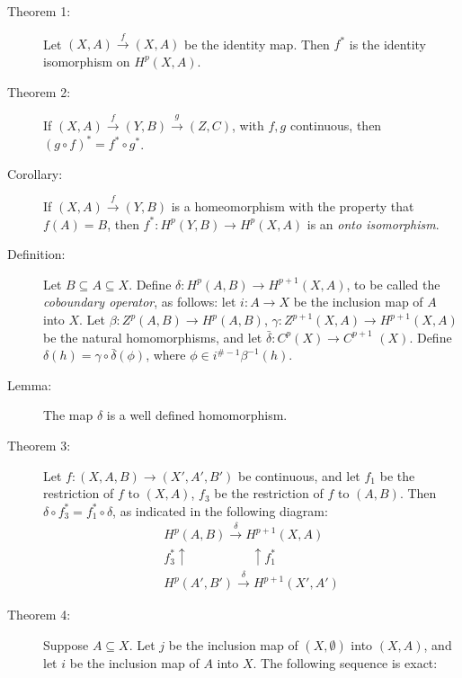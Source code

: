 \documentclass{article}
\begin{document}
\begin{description}

\item[Theorem 1:] Let $(X,A) \xrightarrow{\ f \ } (X,A)$ be the identity map. Then $f^*$ is the identity isomorphism on $H^p(X,A)$.

\item[Theorem 2:] If $(X,A) \xrightarrow{\ f \ } (Y,B) \xrightarrow{\ g \ } (Z,C)$, with $f,g$ continuous, then $(g \circ f)^* = f^* \circ g^*$.

\item[Corollary:] If $(X,A) \xrightarrow{\ f \ } (Y,B)$ is a homeomorphism with the property that $f(A)=B$, then $f^*: H^p(Y,B) \longrightarrow H^p(X,A)$ is an \emph{onto isomorphism}.

\item[Definition:] Let $B \subseteq A \subseteq X$. Define $\delta: H^p(A,B) \longrightarrow H^{p+1}(X,A)$, to be called the \emph{coboundary operator}, as follows: let $i: A \rightarrow X$ be the inclusion map of $A$ into $X$. Let $\beta: Z^p(A,B) \longrightarrow H^p(A,B)$, $\gamma: Z^{p+1}(X,A) \longrightarrow H^{p+1}(X,A)$ be the natural homomorphisms, and let $\bar{\delta}: C^p(X) \longrightarrow C^{p+1}$ $(X)$. Define $\delta(h) = \gamma \circ \bar{\delta} (\phi)$, where $\phi \in i^{\# -1} \beta^{-1}(h)$.

\item[Lemma:] The map $\delta$ is a well defined homomorphism.

\item[Theorem 3:] Let $f: (X,A,B) \longrightarrow (X',A',B')$ be continuous, and let $f_1$ be the restriction of $f$ to $(X,A)$, $f_3$ be the restriction of $f$ to $(A,B)$. Then $\delta \circ f_3^* = f_1^* \circ \delta$, as indicated in the following diagram:
  \begin{gather*}
  H^p(A,B) \xrightarrow{\ \delta \ } H^{p+1}(X,A) \\
  f_3^* \uparrow \quad\quad\quad\quad\quad \uparrow f_1^* \\
  H^p(A',B') \xrightarrow{\ \delta \ } H^{p+1}(X',A')
  \end{gather*}

\item[Theorem 4:] Suppose $A \subseteq X$. Let $j$ be the inclusion map of $(X,\emptyset)$ into $(X,A)$, and let $i$ be the inclusion map of $A$ into $X$. The following sequence is exact:

\end{description}
\end{document}
